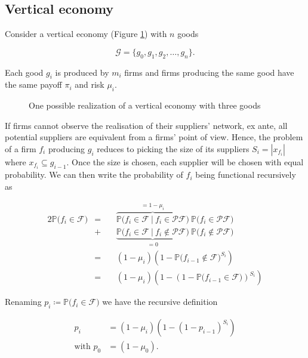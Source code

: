 \documentclass[american, abstract=on]{scrartcl}
\newcommand{\inputTikZ}[2]{%
      \scalebox{#1}{}  
    }
\newcommand{\F}{\mathcal{F}}
\newcommand{\G}{\mathcal{G}}
\newcommand{\PF}{\mathcal{P} \F}
\renewcommand{\P}{\mathbb{P}}
\newcommand{\abs}[1]{\left\lvert#1\right\rvert}
\begin{document}
\subsection{Vertical economy}

Consider a vertical economy (Figure \ref{fig:vertical}) with $n$ goods

\begin{equation}
  \G = \{g_0, g_1, g_2, \ldots, g_n\}.
\end{equation}

Each good $g_i$ is produced by $m_i$ firms and firms producing the same good have the same payoff $\pi_i$ and risk $\mu_i$.

\begin{figure}[H]
  \centering
  \inputTikZ{0.7}{diagrams/vertical-economy.tikz} 
  \caption{One possible realization of a vertical economy with three goods}
  \label{fig:vertical}
\end{figure}

If firms cannot observe the realisation of their suppliers' network, ex ante, all potential suppliers are equivalent from a firms' point of view. Hence, the problem of a firm $f_i$ producing $g_i$ reduces to picking the size of its suppliers $S_i = \abs{x_{f_i}}$ where $x_{f_i} \subseteq g_{i - 1}$. Once the size is chosen, each supplier will be chosen with equal probability. We can then write the probability of $f_i$ being functional recursively as

\begin{alignat*}{2}
  \P\Big( f_i \in \F \Big) &= \ &&\overbrace{\P\Big( f_i \in \F \ \vert \ f_i \in \PF \Big)}^{= 1 - \mu_i} \ \P\Big( f_i \in \PF \Big) \\
  &+ &&\underbrace{\P\Big( f_i \in \F \ \vert \ f_i \notin \PF \Big)}_{= 0} \  \P\Big( f_i \notin \PF \Big) \\
  &= &&(1 - \mu_i) \left( 1 - \P\Big( f_{i-1} \notin \F \Big)^{S_i} \right) \\
  &= &&(1 - \mu_i) \left( 1 - \left(1 - \P\Big( f_{i-1} \in \F \Big)\right)^{S_i} \right)
\end{alignat*}

Renaming $p_i \coloneqq \P\Big( f_i \in \F \Big)$ we have the recursive definition

\begin{equation}
  \begin{split}
    p_{i} &= (1 - \mu_i) \left( 1 - (1 - p_{i-1})^{S_i} \right) \\
    \text{with } p_0 &= (1 - \mu_0).
  \end{split}
\end{equation}
\end{document}
